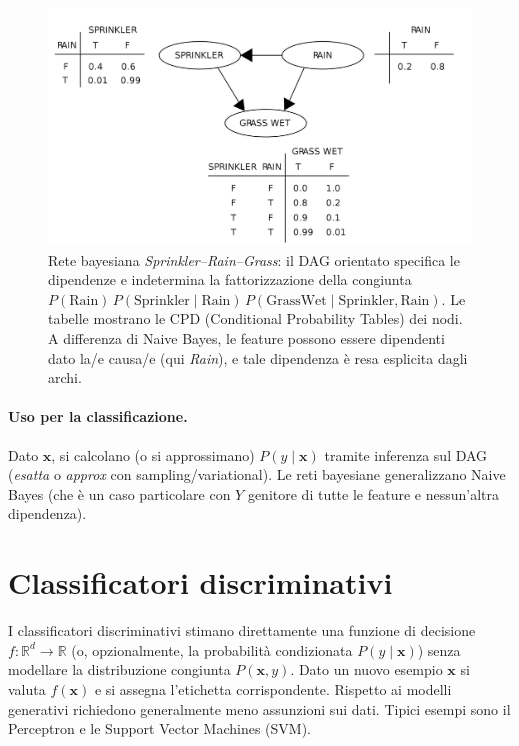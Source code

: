 \begin{figure}[htbp]
  \centering
  \includegraphics[width=.9\textwidth]{images/bayes_network_example.png}
  \caption[Bayes net Sprinkler–Rain–Grass]{Rete bayesiana \emph{Sprinkler–Rain–Grass}: il DAG orientato specifica le dipendenze e indetermina la fattorizzazione della congiunta
  \(P(\text{Rain})\,P(\text{Sprinkler}\mid \text{Rain})\,P(\text{GrassWet}\mid \text{Sprinkler},\text{Rain})\).
  Le tabelle mostrano le CPD (Conditional Probability Tables) dei nodi.
  A differenza di Naive Bayes, le feature possono essere dipendenti dato la/e causa/e (qui \textit{Rain}), e tale dipendenza è resa esplicita dagli archi.}
  \label{fig:bayes-net}
\end{figure}

\paragraph{Uso per la classificazione.}
Dato $\mathbf{x}$, si calcolano (o si approssimano) $P(y\mid \mathbf{x})$ tramite inferenza sul DAG (\emph{esatta} o \emph{approx} con sampling/variational). Le reti bayesiane generalizzano Naive Bayes (che è un caso particolare con $Y$ genitore di tutte le feature e nessun’altra dipendenza).

\section{Classificatori discriminativi}\label{sec:discriminativi}
I classificatori discriminativi stimano direttamente una funzione di decisione $f:\mathbb{R}^d\to\mathbb{R}$ (o, opzionalmente, la probabilità condizionata $P(y\mid\mathbf{x})$) senza modellare la distribuzione congiunta $P(\mathbf{x},y)$. Dato un nuovo esempio $\mathbf{x}$ si valuta $f(\mathbf{x})$ e si assegna l'etichetta corrispondente. Rispetto ai modelli generativi richiedono generalmente meno assunzioni sui dati. Tipici esempi sono il Perceptron e le Support Vector Machines (SVM).

